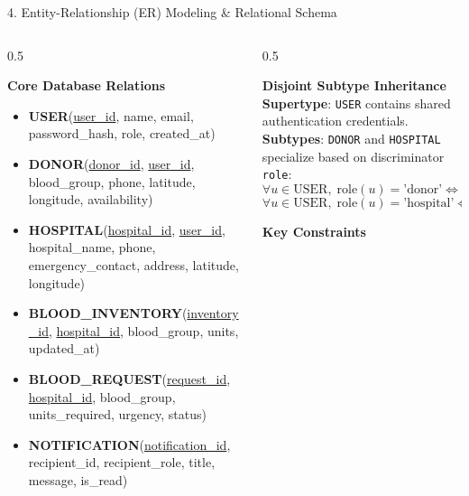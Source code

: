 \documentclass[aspectratio=169,10pt]{beamer}
\begin{document}
\begin{frame}{4. Entity-Relationship (ER) Modeling \& Relational Schema}
    \begin{columns}[T]
        \begin{column}{0.5\textwidth}
            \begin{block}{\textbf{Core Database Relations}}
                \scriptsize
                \begin{itemize}
                    \item \textbf{USER}(\underline{user\_id}, name, email, password\_hash, role, created\_at)
                    \item \textbf{DONOR}(\underline{donor\_id}, \underline{user\_id}, blood\_group, phone, latitude, longitude, availability)
                    \item \textbf{HOSPITAL}(\underline{hospital\_id}, \underline{user\_id}, hospital\_name, phone, emergency\_contact, address, latitude, longitude)
                    \item \textbf{BLOOD\_INVENTORY}(\underline{inventory\_id}, \underline{hospital\_id}, blood\_group, units, updated\_at)
                    \item \textbf{BLOOD\_REQUEST}(\underline{request\_id}, \underline{hospital\_id}, blood\_group, units\_required, urgency, status)
                    \item \textbf{NOTIFICATION}(\underline{notification\_id}, recipient\_id, recipient\_role, title, message, is\_read)
                \end{itemize}
            \end{block}
        \end{column}
        \begin{column}{0.5\textwidth}
            \begin{alertblock}{\textbf{Disjoint Subtype Inheritance}}
                \scriptsize
                \textbf{Supertype}: \texttt{USER} contains shared authentication credentials. \\
                \textbf{Subtypes}: \texttt{DONOR} and \texttt{HOSPITAL} specialize based on discriminator \texttt{role}:
                \[ \forall u \in \text{USER},\; \text{role}(u) = \text{'donor'} \iff \exists!\, d \in \text{DONOR} \]
                \[ \forall u \in \text{USER},\; \text{role}(u) = \text{'hospital'} \iff \exists!\, h \in \text{HOSPITAL} \]
            \end{alertblock}
            \begin{exampleblock}{\textbf{Key Constraints}}

\end{exampleblock}
\end{column}
\end{columns}
\end{frame}
\end{document}
